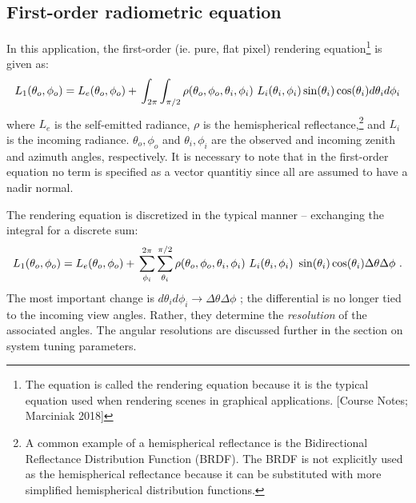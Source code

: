 \documentclass{article}
\numberwithin{equation}{section}
\begin{document}
    \subsection{First-order radiometric equation} \label{radio1}

        In this application, the first-order (ie. pure, flat pixel) rendering equation\footnote{
            The equation is called the rendering equation because it is the typical equation used when rendering
            scenes in graphical applications. [Course Notes; Marciniak 2018]
        } is given as:
        $$
            L_{1}(\theta_o, \phi_o) = \\
                L_{e}(\theta_o, \phi_o) + \\
                \int_{2\pi}\int_{\pi/2}\rho(\theta_o, \phi_o, \theta_i, \phi_i)\ L_{i}(\theta_i, \phi_i) \\
                \sin(\theta_i)\cos(\theta_i) d\theta_i d\phi_i
        $$
        where $L_e$ is the self-emitted radiance, $\rho$ is the hemispherical reflectance,\footnote{
            A common example of a hemispherical reflectance is the Bidirectional Reflectance Distribution Function
            (BRDF).
            The BRDF is not explicitly used as the hemispherical reflectance because it can be substituted with
            more simplified hemispherical distribution functions.
        } and $L_i$ is the
        incoming radiance.
        $\theta_o, \phi_o$ and $\theta_i, \phi_i$ are the observed and incoming zenith and azimuth angles,
        respectively.
        It is necessary to note that in the first-order equation no term is specified as a vector quantitiy since
        all are assumed to have a nadir normal.

        The rendering equation is discretized in the typical manner -- exchanging the integral for a discrete sum:
        \begin{equation} \label{rend1}
            L_{1}(\theta_o, \phi_o) = \\
                L_{e}(\theta_o, \phi_o) + \\
                \sum^{2\pi}_{\phi_i}\sum^{\pi/2}_{\theta_i}\rho(\theta_o, \phi_o, \theta_i, \phi_i)\
                L_{i}(\theta_i, \phi_i)\ \sin(\theta_i)\cos(\theta_i) \Delta\theta \Delta\phi\ .
        \end{equation}
        The most important change is $d\theta_i d\phi_i \rightarrow \Delta\theta \Delta\phi$ ;
        the differential is no longer tied to the incoming view angles.
        Rather, they determine the \textit{resolution} of the associated angles.
        The angular resolutions are discussed further in the section on system tuning parameters.
\end{document}
